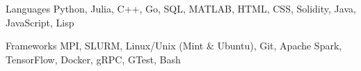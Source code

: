 
\begin{cvskills}
  \cvskill
    {Languages} %
    {Python, Julia, C++, Go, SQL, MATLAB, HTML, CSS, Solidity, Java, JavaScript, Lisp} %

  \cvskill
    {Frameworks} %
    {MPI, SLURM, Linux/Unix (Mint \& Ubuntu), Git, Apache Spark, TensorFlow, Docker, gRPC, GTest, Bash} %
\end{cvskills}
